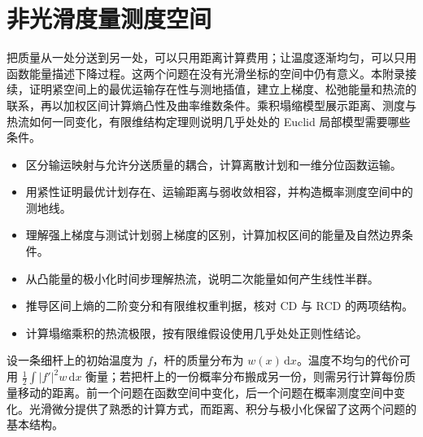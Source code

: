 
% 
% 
% 
% 
% 
% 

\chapter{非光滑度量测度空间}
\label{g3:app:C}

\begin{chapterabstract}
	把质量从一处分送到另一处，可以只用距离计算费用；让温度逐渐均匀，可以只用函数能量描述下降过程。这两个问题在没有光滑坐标的空间中仍有意义。本附录接续，证明紧空间上的最优运输存在性与测地插值，建立上梯度、松弛能量和热流的联系，再以加权区间计算熵凸性及曲率维数条件。乘积塌缩模型展示距离、测度与热流如何一同变化，有限维结构定理则说明几乎处处的 Euclid 局部模型需要哪些条件。
\end{chapterabstract}

\begin{learninggoals}
	\begin{itemize}
		\item 区分输运映射与允许分送质量的耦合，计算离散计划和一维分位函数运输。
		\item 用紧性证明最优计划存在、运输距离与弱收敛相容，并构造概率测度空间中的测地线。
		\item 理解强上梯度与测试计划弱上梯度的区别，计算加权区间的能量及自然边界条件。
		\item 从凸能量的极小化时间步理解热流，说明二次能量如何产生线性半群。
		\item 推导区间上熵的二阶变分和有限维权重判据，核对 CD 与 RCD 的两项结构。
		\item 计算塌缩乘积的热流极限，按有限维假设使用几乎处处正则性结论。
	\end{itemize}
\end{learninggoals}

设一条细杆上的初始温度为 \(f\)，杆的质量分布为 \(w(x)\,\mathrm dx\)。温度不均匀的代价可用 \(\tfrac12\int|f'|^2w\,\mathrm dx\) 衡量；若把杆上的一份概率分布搬成另一份，则需另行计算每份质量移动的距离。前一个问题在函数空间中变化，后一个问题在概率测度空间中变化。光滑微分提供了熟悉的计算方式，而距离、积分与极小化保留了这两个问题的基本结构。

